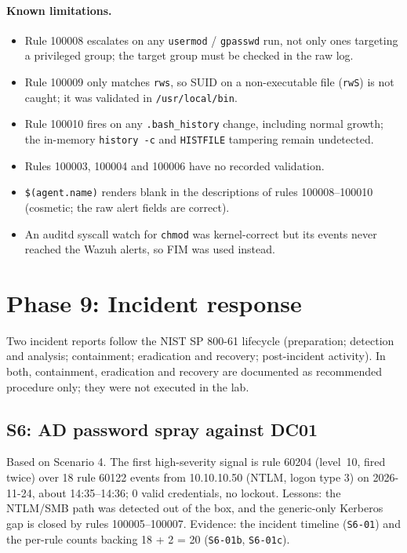 \documentclass[11pt,a4paper]{article}
\begin{document}
\paragraph{Known limitations.}
\begin{itemize}
  \item Rule 100008 escalates on any \texttt{usermod} / \texttt{gpasswd} run,
        not only ones targeting a privileged group; the target group must be
        checked in the raw log.
  \item Rule 100009 only matches \texttt{rws}, so SUID on a non-executable
        file (\texttt{rwS}) is not caught; it was validated in
        \texttt{/usr/local/bin}.
  \item Rule 100010 fires on any \texttt{.bash\_history} change, including
        normal growth; the in-memory \texttt{history -c} and \texttt{HISTFILE}
        tampering remain undetected.
  \item Rules 100003, 100004 and 100006 have no recorded validation.
  \item \texttt{\$(agent.name)} renders blank in the descriptions of rules
        100008--100010 (cosmetic; the raw alert fields are correct).
  \item An auditd syscall watch for \texttt{chmod} was kernel-correct but its
        events never reached the Wazuh alerts, so FIM was used instead.
\end{itemize}

\section{Phase 9: Incident response}

Two incident reports follow the NIST SP 800-61 lifecycle (preparation;
detection and analysis; containment; eradication and recovery;
post-incident activity). In both, containment, eradication and recovery are
documented as recommended procedure only; they were not executed in the lab.

\subsection{S6: AD password spray against DC01}

Based on Scenario 4. The first high-severity signal is rule 60204 (level~10,
fired twice) over 18 rule 60122 events from 10.10.10.50 (NTLM, logon type 3)
on 2026-11-24, about 14:35--14:36; 0 valid credentials, no lockout. Lessons:
the NTLM/SMB path was detected out of the box, and the generic-only Kerberos
gap is closed by rules 100005--100007. Evidence: the incident timeline
(\texttt{S6-01}) and the per-rule counts backing 18 + 2 = 20
(\texttt{S6-01b}, \texttt{S6-01c}).
\end{document}
